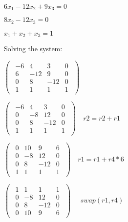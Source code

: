 $6x_1 - 12x_2 + 9x_3 = 0$
\singlespacing

$8x_2 - 12x_3 = 0$
\singlespacing

$x_1 + x_2 + x_3 = 1$

\singlespacing
\singlespacing
Solving the system:
\singlespacing

\begin{math}
    \begin{pmatrix}
        \begin{array}{ccc|c}
            -6 & 4   & 3   & 0 \\
            6  & -12 & 9   & 0 \\
            0  & 8   & -12 & 0 \\
            1  & 1   & 1   & 1
        \end{array}
    \end{pmatrix}
\end{math}

\singlespacing

\begin{math}
    \begin{pmatrix}
        \begin{array}{ccc|c}
            -6 & 4  & 3   & 0 \\
            0  & -8 & 12  & 0 \\
            0  & 8  & -12 & 0 \\
            1  & 1  & 1   & 1
        \end{array}
    \end{pmatrix}\quad
    r2 = r2  + r1
\end{math}

\singlespacing

\begin{math}
    \begin{pmatrix}
        \begin{array}{ccc|c}
            0 & 10 & 9   & 6 \\
            0 & -8 & 12  & 0 \\
            0 & 8  & -12 & 0 \\
            1 & 1  & 1   & 1
        \end{array}
    \end{pmatrix}\quad
    r1 = r1  + r4*6
\end{math}

\singlespacing

\begin{math}
    \begin{pmatrix}
        \begin{array}{ccc|c}
            1 & 1  & 1   & 1 \\
            0 & -8 & 12  & 0 \\
            0 & 8  & -12 & 0 \\
            0 & 10 & 9   & 6
        \end{array}
    \end{pmatrix}\quad
    \begin{array}{c}
        swap(r1, r4)
    \end{array}
\end{math}

